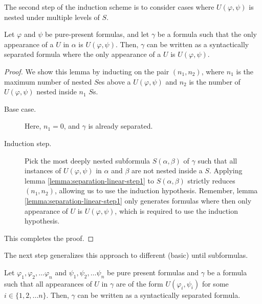 \documentclass[a4paper,UKenglish,cleveref, autoref, thm-restate, numberwithinsect]{lipics-v2021}
\begin{document}
The second step of the induction scheme is to consider cases where $U(\varphi, \psi)$ is nested under multiple levels of $S$.
\begin{lemma}
\label{lemma:separation-linear-step2}
    Let $\varphi$ and $\psi$ be pure-present formulas, and let $\gamma$ be a formula such that the only appearance of a $U$ in $\alpha$ is $U(\varphi, \psi)$. Then, $\gamma$ can be written as a syntactically separated formula where the only appearance of a $U$ is $U(\varphi, \psi)$.
\end{lemma}
\begin{proof}
    We show this lemma by inducting on the pair $(n_1, n_2)$, where $n_1$ is the maximum number of nested $S$es above a $U(\varphi, \psi)$ and $n_2$ is the number of $U(\varphi, \psi)$ nested inside $n_1$ $S$s.
    \begin{description}
        \item[Base case.] Here, $n_1 = 0$, and $\gamma$ is already separated.
        \item[Induction step.] Pick the most deeply nested subformula $S(\alpha, \beta)$ of $\gamma$ such that all instances of $U(\varphi, \psi)$ in $\alpha$ and $\beta$ are not nested inside a $S$. Applying lemma \ref{lemma:separation-linear-step1} to $S(\alpha, \beta)$ strictly reduces $(n_1, n_2)$, allowing us to use the induction hypothesis. Remember, lemma \ref{lemma:separation-linear-step1} only generates formulas where then only appearance of $U$ is $U(\varphi, \psi)$, which is required to use the induction hypothesis.
    \end{description}
    This completes the proof.
\end{proof}
The next step generalizes this approach to different (basic) until subformulas.
\begin{lemma}
\label{lemma:separation-linear-step3}
    Let $\varphi_1, \varphi_2, \ldots \varphi_n$ and $\psi_1, \psi_2, \ldots \psi_n$ be pure present formulas and $\gamma$ be a formula such that all appearances of $U$ in $\gamma$ are of the form $U(\varphi_i, \psi_i)$ for some $i \in \{1, 2, \ldots n\}$. Then, $\gamma$ can be written as a syntactically separated formula.
\end{lemma}
\end{document}
